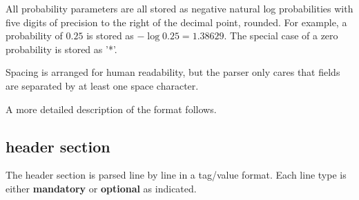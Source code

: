 All probability parameters are all stored as negative natural log
probabilities with five digits of precision to the right of the
decimal point, rounded. For example, a probability of $0.25$ is stored
as $-\log 0.25 = 1.38629$. The special case of a zero probability is
stored as '*'.

Spacing is arranged for human readability, but the parser only cares
that fields are separated by at least one space character.

A more detailed description of the format follows.

\subsection{header section}

The header section is parsed line by line in a tag/value format. Each
line type is either \textbf{mandatory} or \textbf{optional} as
indicated. 

